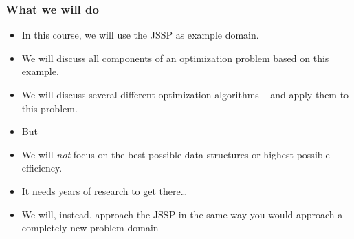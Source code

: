 \documentclass[mathserif]{beamer}%
\begin{document}
%
\begin{frame}%
\frametitle{What we will do}%
\begin{itemize}%
\item In this course, we will use the JSSP as example domain.%
\item<2-> We will discuss all components of an optimization problem based on this example.%
\item<3-> We will discuss several different optimization algorithms -- and apply them to this problem.%
\item<4-> \alert{But}%
\item<5-> We will \emph{not} focus on the best possible data structures or highest possible efficiency.%
\item<6-> It needs years of research to get there\dots%
\item<7-> We will, instead, approach the JSSP in the same way you would approach a completely new problem domain%
\end{itemize}%
\end{frame}%
%
\end{document}

